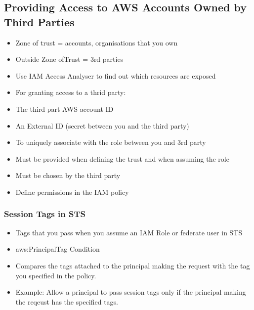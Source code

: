 \subsection{Providing Access to AWS Accounts Owned by Third Parties}
\begin{itemize}
    \item Zone of trust = accounts, organisations that you own
    \item Outside Zone ofTrust = 3rd parties
    \item Use IAM Access Analyser to find out which resources are exposed
    \item For granting access to a thrid party:
    \item The third part AWS account ID
    \item An External ID (secret between you and the third party)
    \item To uniquely associate with the role between you and 3rd party
    \item Must be provided when defining the trust and when assuming the role
    \item Must be chosen by the third party
    \item Define permissions in the IAM policy
\end{itemize}


\subsubsection{Session Tags in STS}
\begin{itemize}
    \item Tags that you pass when you assume an IAM Role or federate user in STS
    \item aws:PrincipalTag Condition
    \item Compares the tags attached to the principal making the request with the tag you specified in the policy.
    \item Example: Allow a principal to pass session tags only if the principal making the reqeust has the specified tags.
\end{itemize}

